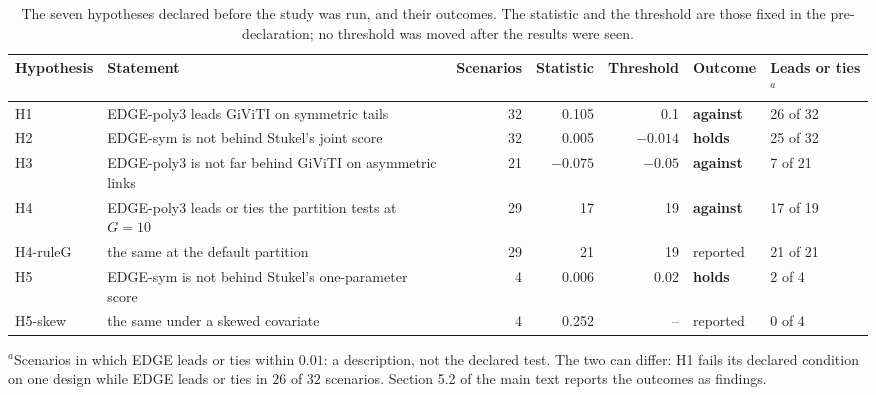 \begin{table}[htbp]\centering\small
\caption{The seven hypotheses declared before the study was run, and their outcomes. The
statistic and the threshold are those fixed in the pre-declaration; no threshold was moved after
the results were seen.}
\label{tab:hypotheses}
\vspace{4pt}
\setlength{\tabcolsep}{4pt}
\begin{tabular}{@{}l>{\raggedright\arraybackslash}p{}rrrll@{}}\toprule
Hypothesis & Statement & Scenarios & Statistic & Threshold & Outcome & Leads or ties$^{a}$ \\ \midrule
H1 & EDGE-poly3 leads GiViTI on symmetric tails & 32 & 0.105 & 0.1 & \textbf{against} & 26 of 32 \\
H2 & EDGE-sym is not behind Stukel's joint score & 32 & 0.005 & $-0.014$ & \textbf{holds} & 25 of 32 \\
H3 & EDGE-poly3 is not far behind GiViTI on asymmetric links & 21 & $-0.075$ & $-0.05$ & \textbf{against} & 7 of 21 \\
H4 & EDGE-poly3 leads or ties the partition tests at $G=10$ & 29 & 17 & 19 & \textbf{against} & 17 of 19 \\
H4-ruleG & the same at the default partition & 29 & 21 & 19 & reported & 21 of 21 \\
H5 & EDGE-sym is not behind Stukel's one-parameter score & 4 & 0.006 & 0.02 & \textbf{holds} & 2 of 4 \\
H5-skew & the same under a skewed covariate & 4 & 0.252 & -- & reported & 0 of 4 \\
\bottomrule\end{tabular}
\par\smallskip\parbox{\textwidth}{\footnotesize $^{a}$Scenarios in which EDGE leads or ties within $0.01$:
a description, not the declared test. The two can differ: H1 fails its declared condition on one
design while EDGE leads or ties in $26$ of $32$ scenarios. Section 5.2 of the main text reports
the outcomes as findings.}
\end{table}
